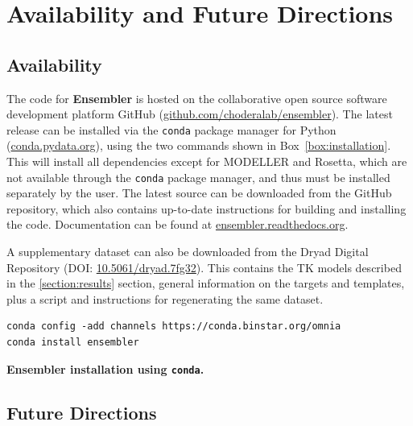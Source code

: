 \documentclass[aps,pre,twocolumn,nofootinbib,superscriptaddress,linenumbers]{revtex4-1}
\begin{document}
\section{Availability and Future Directions}
\label{section:availability}

\subsection*{Availability}

The code for {\bf Ensembler} is hosted on the collaborative open source software development platform GitHub (\href{http://github.com/choderalab/ensembler}{github.com/choderalab/ensembler}).
The latest release can be installed via the {\tt conda} package manager for Python (\href{http://conda.pydata.org}{conda.pydata.org}), using the two commands shown in Box~\ref{box:installation}.
This will install all dependencies except for MODELLER and Rosetta, which are not available through the {\tt conda} package manager, and thus must be installed separately by the user.
The latest source can be downloaded from the GitHub repository, which also contains up-to-date instructions for building and installing the code.
Documentation can be found at \href{http://ensembler.readthedocs.org/en/latest/}{ensembler.readthedocs.org}.

A supplementary dataset can also be downloaded from the Dryad Digital Repository (DOI: \href{https://dx.doi.org/10.5061/dryad.7fg32}{10.5061/dryad.7fg32}).
This contains the TK models described in the \ref{section:results} section, general information on the targets and templates, plus a script and instructions for regenerating the same dataset.

\begin{codebox}[tbp]
\scriptsize
\begin{Verbatim}[frame=single]
conda config -add channels https://conda.binstar.org/omnia
conda install ensembler
\end{Verbatim}
\caption{{\bf Ensembler installation using {\tt conda}.}
}
\label{box:installation}
\end{codebox}

\subsection*{Future Directions}
\end{document}
